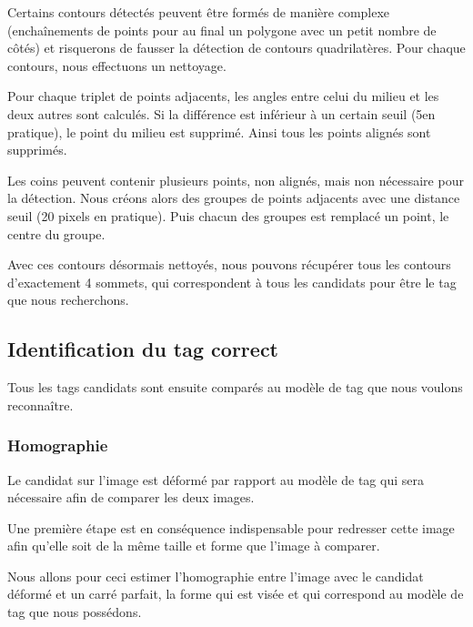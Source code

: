         Certains contours détectés peuvent être formés de manière complexe (enchaînements de points pour au final un polygone avec un petit nombre de côtés) et risquerons de fausser la détection de contours quadrilatères. Pour chaque contours, nous effectuons un nettoyage. 

        Pour chaque triplet de points adjacents, les angles entre celui du milieu et les deux autres sont calculés. Si la différence est inférieur à un certain seuil (5\degree en pratique), le point du milieu est supprimé. Ainsi tous les points alignés sont supprimés. 

        Les coins peuvent contenir plusieurs points, non alignés, mais non nécessaire pour la détection. Nous créons alors des groupes de points adjacents avec une distance seuil (20 pixels en pratique). Puis chacun des groupes est remplacé un point, le centre du groupe.

        Avec ces contours désormais nettoyés, nous pouvons récupérer tous les contours d'exactement 4 sommets, qui correspondent à tous les candidats pour être le tag que nous recherchons.

        \subsection{Identification du tag correct}

        Tous les tags candidats sont ensuite comparés au modèle de tag que nous voulons reconnaître.

        \subsubsection{Homographie}
        \label{subsubsec:homographie}

        Le candidat sur l'image est déformé par rapport au modèle de tag qui sera nécessaire afin de comparer les deux images.

        Une première étape est en conséquence indispensable pour redresser cette image afin qu'elle soit de la même taille et forme que l'image à comparer.

        Nous allons pour ceci estimer l'homographie entre l'image avec le candidat déformé et un carré parfait, la forme qui est visée et qui correspond au modèle de tag que nous possédons.

